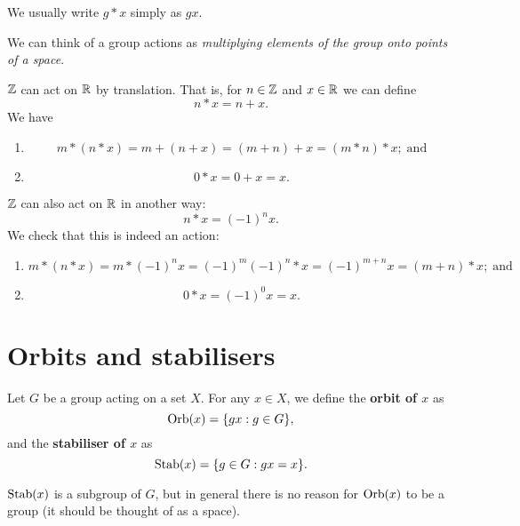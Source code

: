 We usually write $g * x$ simply as $gx$.

\begin{remark}
    We can think of a group actions as 
    \emph{multiplying elements of the group onto points of a space}.
\end{remark}

\begin{example}
    $\mathbb{Z}$ can act on $\mathbb{R}$ by translation. 
    That is,
    for $n \in \mathbb{Z}$ and $x \in \mathbb{R}$ we can define
    \[
        n * x = n + x.
    \]
    We have
    \begin{enumerate}
        \item 
            \[
                m * (n * x) = m + (n + x) = (m + n) + x = (m * n) * x; \;\text{and}
            \]

        \item
            \[
                0 * x = 0 + x = x.
            \]
    \end{enumerate}
\end{example}

\begin{example}
    $\mathbb{Z}$ can also act on $\mathbb{R}$ in another way:
    \[
        n * x = (-1)^n x.
    \]
    We check that this is indeed an action:
    \begin{enumerate}
        \item
            \[
                m * (n * x) = m * (-1)^n x = (-1)^m (-1)^n * x = (-1)^{m + n} x = (m + n) * x;
                \;\text{and}
            \]
            
        \item 
            \[
                0 * x = (-1)^0 x = x.
            \]
    \end{enumerate}
\end{example}

\section{Orbits and stabilisers}

\begin{definition}[]
    Let $G$ be a group acting on a set $X$.
    For any $x \in X$, we define the \textbf{orbit of $x$} as
    \[
        \operatorname{Orb}(x) = \{gx : g \in G\},
    \]
    and the \textbf{stabiliser of $x$} as
    \[
        \operatorname{Stab}(x) = \{g \in G: gx = x\}.
    \]
\end{definition}

\begin{remark}
    $\operatorname{Stab}(x)$ is a subgroup of $G$, but in general there is no reason for $\operatorname{Orb}(x)$
    to be a group (it should be thought of as a space).
\end{remark}
